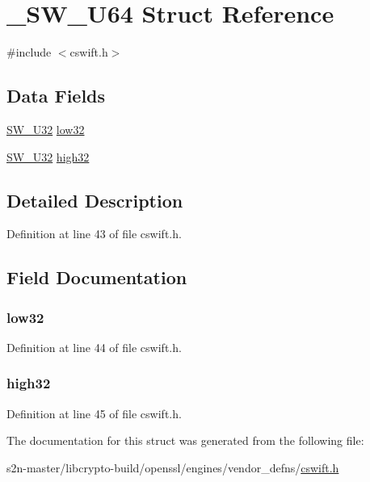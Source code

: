 \hypertarget{struct___s_w___u64}{}\section{\+\_\+\+S\+W\+\_\+\+U64 Struct Reference}
\label{struct___s_w___u64}


{\ttfamily \#include $<$cswift.\+h$>$}

\subsection*{Data Fields}
\begin{DoxyCompactItemize}
\item 
\hyperlink{cswift_8h_a1ddf1d5a0d87795e81e41be673cbabeb}{S\+W\+\_\+\+U32} \hyperlink{struct___s_w___u64_a03f869c9cb15fc9cddd082dbb0d4a68d}{low32}
\item 
\hyperlink{cswift_8h_a1ddf1d5a0d87795e81e41be673cbabeb}{S\+W\+\_\+\+U32} \hyperlink{struct___s_w___u64_aff3f304a0817eca444a0b970e6b777a8}{high32}
\end{DoxyCompactItemize}


\subsection{Detailed Description}


Definition at line 43 of file cswift.\+h.



\subsection{Field Documentation}
\subsubsection[{\texorpdfstring{low32}{low32}}]{ low32}\hypertarget{struct___s_w___u64_a03f869c9cb15fc9cddd082dbb0d4a68d}{}\label{struct___s_w___u64_a03f869c9cb15fc9cddd082dbb0d4a68d}


Definition at line 44 of file cswift.\+h.

\subsubsection[{\texorpdfstring{high32}{high32}}]{ high32}\hypertarget{struct___s_w___u64_aff3f304a0817eca444a0b970e6b777a8}{}\label{struct___s_w___u64_aff3f304a0817eca444a0b970e6b777a8}


Definition at line 45 of file cswift.\+h.



The documentation for this struct was generated from the following file\+:\begin{DoxyCompactItemize}
\item 
s2n-\/master/libcrypto-\/build/openssl/engines/vendor\+\_\+defns/\hyperlink{cswift_8h}{cswift.\+h}\end{DoxyCompactItemize}
